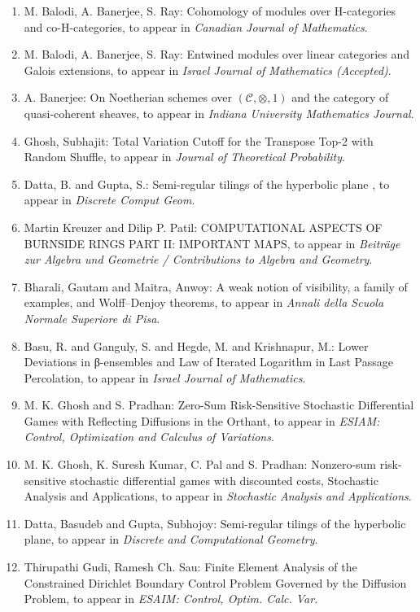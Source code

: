 \begin{enumerate}
\item M. Balodi, A. Banerjee, S. Ray: Cohomology of modules over H-categories and co-H-categories, to appear in \emph{Canadian Journal of Mathematics}.
\item M. Balodi, A. Banerjee, S. Ray: Entwined modules over linear categories and Galois extensions, to appear in \emph{Israel Journal of Mathematics (Accepted)}.
\item A. Banerjee: On Noetherian schemes over $(\mathcal C,\otimes,1)$ and the category of quasi-coherent sheaves, to appear in \emph{Indiana University Mathematics Journal}.
\item Ghosh, Subhajit: Total Variation Cutoff for the Transpose Top-2 with Random Shuffle, to appear in \emph{Journal of Theoretical Probability}.
\item Datta, B. and Gupta, S.: Semi-regular tilings of the hyperbolic plane \label{bdsg_2019}, to appear in \emph{Discrete Comput Geom}.
\item Martin Kreuzer and Dilip P. Patil: COMPUTATIONAL ASPECTS OF BURNSIDE RINGS PART II: IMPORTANT MAPS, to appear in \emph{Beiträge zur Algebra und Geometrie / Contributions to Algebra and Geometry}.
\item Bharali, Gautam and Maitra, Anwoy: A weak notion of visibility, a family of examples, and Wolff--Denjoy theorems, to appear in \emph{Annali della Scuola Normale Superiore di Pisa}.
\item Basu, R. and Ganguly, S. and Hegde, M. and Krishnapur, M.: Lower Deviations in β-ensembles and Law of Iterated Logarithm in Last Passage Percolation, to appear in \emph{Israel Journal of Mathematics}.
\item M. K. Ghosh and S. Pradhan: Zero-Sum Risk-Sensitive Stochastic Differential Games with Reflecting Diffusions in the Orthant, to appear in \emph{ESIAM: Control, Optimization and Calculus of Variations}.
\item M. K. Ghosh, K. Suresh Kumar, C. Pal and S. Pradhan: Nonzero-sum risk-sensitive stochastic differential games with discounted costs, Stochastic Analysis and Applications, to appear in \emph{Stochastic Analysis and Applications}.
\item Datta, Basudeb and Gupta, Subhojoy: Semi-regular tilings of the hyperbolic plane, to appear in \emph{Discrete and Computational Geometry}.
\item Thirupathi Gudi, Ramesh Ch. Sau: Finite Element Analysis of the Constrained Dirichlet Boundary Control Problem Governed by the Diffusion Problem, to appear in \emph{ESAIM: Control, Optim. Calc. Var}.

\end{enumerate}
